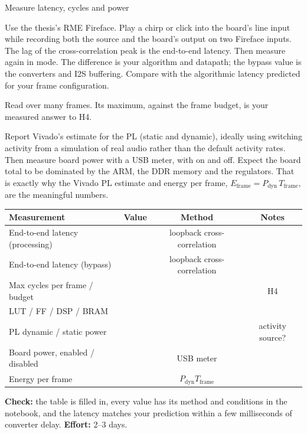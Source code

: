 \begin{stepbox}[label=st:fpga:measure]{Measure latency, cycles and power}
\begin{description}[style=nextline,leftmargin=1.2em]
  \item[Latency]
  Use the thesis's RME Fireface. Play a chirp or click into the board's line
  input while recording both the source and the board's output on two Fireface
  inputs. The lag of the cross-correlation peak is the end-to-end latency. Then
  measure again in  mode. The difference is your algorithm and
  datapath; the bypass value is the converters and I2S buffering. Compare with
  the algorithmic latency predicted for your frame configuration.
  \item[Cycles]
  Read  over many frames. Its maximum, against the frame
  budget, is your measured answer to H4.
  \item[Power]
  Report Vivado's  estimate for the PL (static and dynamic),
  ideally using switching activity from a simulation of real audio rather than
  the default activity rates. Then measure board power with a USB meter, with
   on and off. Expect the board total to be dominated by the
  ARM, the DDR memory and the regulators. That is exactly why the Vivado PL
  estimate and energy per frame, $E_\text{frame}=P_\text{dyn}\,T_\text{frame}$,
  are the meaningful numbers.
\end{description}

\begin{center}\footnotesize
\begin{tabularx}{\textwidth}{@{}LCCC@{}}
\toprule
Measurement & Value & Method & Notes \\
\midrule
End-to-end latency (processing) & & loopback cross-correlation & \\
End-to-end latency (bypass) & & loopback cross-correlation & \\
Max cycles per frame / budget & &  & H4 \\
LUT / FF / DSP / BRAM & &  & \\
PL dynamic / static power & &  & activity source? \\
Board power, enabled / disabled & & USB meter & \\
Energy per frame & & $P_\text{dyn}T_\text{frame}$ & \\
\bottomrule
\end{tabularx}
\end{center}

\textbf{Check:} the table is filled in, every value has its method and
conditions in the notebook, and the latency matches your prediction within a
few milliseconds of converter delay. \textbf{Effort:} 2--3 days.
\end{stepbox}

